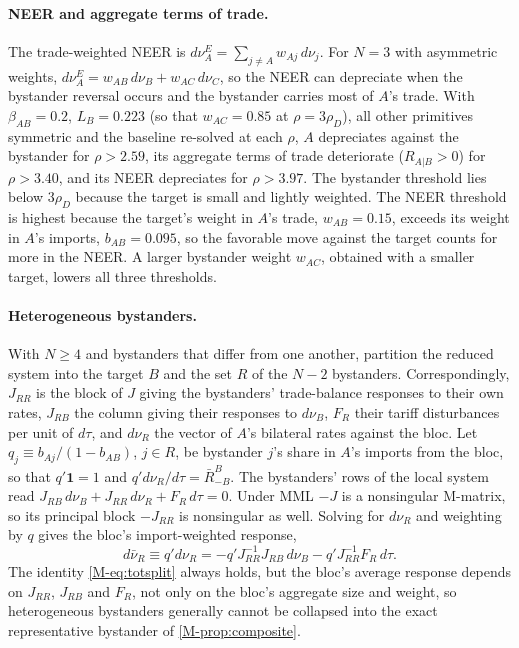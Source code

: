 \documentclass[11pt]{article}
\numberwithin{equation}{section}
\theoremstyle{plain}
\newcommand{\bone}{\mathbf{1}}
\begin{document}
\paragraph{NEER and aggregate terms of trade.} The trade-weighted NEER is $d\nu^E_A=\sum_{j\neq A}w_{Aj}\,d\nu_j$. For $N=3$ with asymmetric weights, $d\nu^E_A=w_{AB}\,d\nu_B+w_{AC}\,d\nu_C$, so the NEER can depreciate when the bystander reversal occurs and the bystander carries most of $A$'s trade. With $\beta_{AB}=0.2$, $L_B=0.223$ (so that $w_{AC}=0.85$ at $\rho=3\rho_D$), all other primitives symmetric and the baseline re-solved at each $\rho$, $A$ depreciates against the bystander for $\rho>2.59$, its aggregate terms of trade deteriorate ($R_{A|B}>0$) for $\rho>3.40$, and its NEER depreciates for $\rho>3.97$. The bystander threshold lies below $3\rho_D$ because the target is small and lightly weighted. The NEER threshold is highest because the target's weight in $A$'s trade, $w_{AB}=0.15$, exceeds its weight in $A$'s imports, $b_{AB}=0.095$, so the favorable move against the target counts for more in the NEER. A larger bystander weight $w_{AC}$, obtained with a smaller target, lowers all three thresholds.

\paragraph{Heterogeneous bystanders.} With $N\geq4$ and bystanders that differ from one another, partition the reduced system into the target $B$ and the set $R$ of the $N-2$ bystanders. Correspondingly, $J_{RR}$ is the block of $J$ giving the bystanders' trade-balance responses to their own rates, $J_{RB}$ the column giving their responses to $d\nu_B$, $F_R$ their tariff disturbances per unit of $d\tau$, and $d\nu_R$ the vector of $A$'s bilateral rates against the bloc. Let $q_j\equiv b_{Aj}/(1-b_{AB})$, $j\in R$, be bystander $j$'s share in $A$'s imports from the bloc, so that $q'\bone=1$ and $q'd\nu_R/d\tau=\bar R^B_{-B}$. The bystanders' rows of the local system read $J_{RB}\,d\nu_B+J_{RR}\,d\nu_R+F_R\,d\tau=0$. Under MML $-J$ is a nonsingular M-matrix, so its principal block $-J_{RR}$ is nonsingular as well. Solving for $d\nu_R$ and weighting by $q$ gives the bloc's import-weighted response,
\begin{equation}
d\bar\nu_R\equiv q'd\nu_R=-q'J_{RR}^{-1}J_{RB}\,d\nu_B-q'J_{RR}^{-1}F_R\,d\tau.
\end{equation}
The identity \cref{M-eq:totsplit} always holds, but the bloc's average response depends on $J_{RR}$, $J_{RB}$ and $F_R$, not only on the bloc's aggregate size and weight, so heterogeneous bystanders generally cannot be collapsed into the exact representative bystander of \cref{M-prop:composite}.
\end{document}
